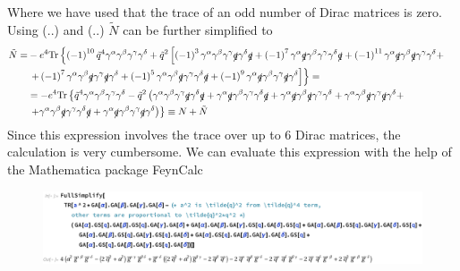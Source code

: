 Where we have used that the trace of an odd number of Dirac matrices is zero. Using (..) and (..) $\tilde{N}$ can be further simplified to
\begin{align*}
\tilde{N} = & -e^4 \mathrm{Tr} \left\lbrace \left( -1 \right)^{10} \tilde{q}^4 \gamma^{\alpha} \gamma^{\beta} \gamma^{\gamma} \gamma^{\delta} + \tilde{q}^2 \left[ \left( -1 \right) ^3  \gamma^{\alpha} \gamma^{\beta} \gamma^{\gamma} \slashed{q} \gamma^{\delta} \slashed{q}  + \left( -1 \right)^7 \gamma^{\alpha} \slashed{q} \gamma^{\beta} \gamma^{\gamma} \gamma^{\delta} \slashed{q} + \left( -1 \right)^{11} \gamma^{\alpha} \slashed{q} \gamma^{\beta} \slashed{q} \gamma^{\gamma} \gamma^{\delta} + \right. \right. & \\
& \left. \left. + \left( -1 \right)^7 \gamma^{\alpha} \gamma^{\beta} \slashed{q} \gamma^{\gamma} \slashed{q} \gamma^{\delta} + \left( -1 \right)^5 \gamma^{\alpha} \gamma^{\beta} \slashed{q} \gamma^{\gamma} \gamma^{\delta} \slashed{q} + \left( -1 \right)^9 \gamma^{\alpha} \slashed{q} \gamma^{\beta} \gamma^{\gamma} \slashed{q} \gamma^{\delta} \right] \right\rbrace = & \\
& = -e^4 \mathrm{Tr} \left\lbrace \tilde{q}^4 \gamma^{\alpha} \gamma^{\beta} \gamma^{\gamma} \gamma^{\delta} - \tilde{q}^2 \left( \gamma^{\alpha} \gamma^{\beta} \gamma^{\gamma} \slashed{q} \gamma^{\delta} \slashed{q} + \gamma^{\alpha} \slashed{q} \gamma^{\beta} \gamma^{\gamma} \gamma^{\delta} \slashed{q} + \gamma^{\alpha} \slashed{q} \gamma^{\beta} \slashed{q} \gamma^{\gamma} \gamma^{\delta} + \gamma^{\alpha} \gamma^{\beta} \slashed{q} \gamma^{\gamma} \slashed{q} \gamma^{\delta} + \right. \right. & \\
& \left. \left. + \gamma^{\alpha} \gamma^{\beta} \slashed{q} \gamma^{\gamma} \gamma^{\delta} \slashed{q} + \gamma^{\alpha} \slashed{q} \gamma^{\beta} \gamma^{\gamma} \slashed{q} \gamma^{\delta} \right) \right\rbrace \equiv N + \tilde{N} &
\end{align*}
Since this expression involves the trace over up to 6 Dirac matrices, the calculation is very cumbersome. We can evaluate this expression with the help of the Mathematica package FeynCalc \cite{FeynCalc,FeynCalc2} 
\begin{figure}[h!]
  \begin{center}
    \includegraphics[width=1.0\textwidth]{Figures/Trace_4ptfct_Mathematica}
  \end{center}
  \setlength{\belowcaptionskip}{-20pt}
  \caption*{}
\end{figure} \\
